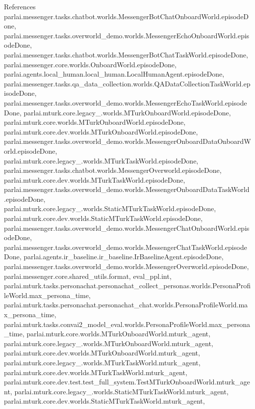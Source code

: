 References parlai.\+messenger.\+tasks.\+chatbot.\+worlds.\+Messenger\+Bot\+Chat\+Onboard\+World.\+episode\+Done, parlai.\+messenger.\+tasks.\+overworld\+\_\+demo.\+worlds.\+Messenger\+Echo\+Onboard\+World.\+episode\+Done, parlai.\+messenger.\+tasks.\+chatbot.\+worlds.\+Messenger\+Bot\+Chat\+Task\+World.\+episode\+Done, parlai.\+messenger.\+core.\+worlds.\+Onboard\+World.\+episode\+Done, parlai.\+agents.\+local\+\_\+human.\+local\+\_\+human.\+Local\+Human\+Agent.\+episode\+Done, parlai.\+messenger.\+tasks.\+qa\+\_\+data\+\_\+collection.\+worlds.\+Q\+A\+Data\+Collection\+Task\+World.\+episode\+Done, parlai.\+messenger.\+tasks.\+overworld\+\_\+demo.\+worlds.\+Messenger\+Echo\+Task\+World.\+episode\+Done, parlai.\+mturk.\+core.\+legacy\+\_.\+worlds.\+M\+Turk\+Onboard\+World.\+episode\+Done, parlai.\+mturk.\+core.\+worlds.\+M\+Turk\+Onboard\+World.\+episode\+Done, parlai.\+mturk.\+core.\+dev.\+worlds.\+M\+Turk\+Onboard\+World.\+episode\+Done, parlai.\+messenger.\+tasks.\+overworld\+\_\+demo.\+worlds.\+Messenger\+Onboard\+Data\+Onboard\+World.\+episode\+Done, parlai.\+mturk.\+core.\+legacy\+\_.\+worlds.\+M\+Turk\+Task\+World.\+episode\+Done, parlai.\+messenger.\+tasks.\+chatbot.\+worlds.\+Messenger\+Overworld.\+episode\+Done, parlai.\+mturk.\+core.\+dev.\+worlds.\+M\+Turk\+Task\+World.\+episode\+Done, parlai.\+messenger.\+tasks.\+overworld\+\_\+demo.\+worlds.\+Messenger\+Onboard\+Data\+Task\+World.\+episode\+Done, parlai.\+mturk.\+core.\+legacy\+\_.\+worlds.\+Static\+M\+Turk\+Task\+World.\+episode\+Done, parlai.\+mturk.\+core.\+dev.\+worlds.\+Static\+M\+Turk\+Task\+World.\+episode\+Done, parlai.\+messenger.\+tasks.\+overworld\+\_\+demo.\+worlds.\+Messenger\+Chat\+Onboard\+World.\+episode\+Done, parlai.\+messenger.\+tasks.\+overworld\+\_\+demo.\+worlds.\+Messenger\+Chat\+Task\+World.\+episode\+Done, parlai.\+agents.\+ir\+\_\+baseline.\+ir\+\_\+baseline.\+Ir\+Baseline\+Agent.\+episode\+Done, parlai.\+messenger.\+tasks.\+overworld\+\_\+demo.\+worlds.\+Messenger\+Overworld.\+episode\+Done, parlai.\+messenger.\+core.\+shared\+\_\+utils.\+format, eval\+\_\+ppl.\+int, parlai.\+mturk.\+tasks.\+personachat.\+personachat\+\_\+collect\+\_\+personas.\+worlds.\+Persona\+Profile\+World.\+max\+\_\+persona\+\_\+time, parlai.\+mturk.\+tasks.\+personachat.\+personachat\+\_\+chat.\+worlds.\+Persona\+Profile\+World.\+max\+\_\+persona\+\_\+time, parlai.\+mturk.\+tasks.\+convai2\+\_\+model\+\_\+eval.\+worlds.\+Persona\+Profile\+World.\+max\+\_\+persona\+\_\+time, parlai.\+mturk.\+core.\+worlds.\+M\+Turk\+Onboard\+World.\+mturk\+\_\+agent, parlai.\+mturk.\+core.\+legacy\+\_.\+worlds.\+M\+Turk\+Onboard\+World.\+mturk\+\_\+agent, parlai.\+mturk.\+core.\+dev.\+worlds.\+M\+Turk\+Onboard\+World.\+mturk\+\_\+agent, parlai.\+mturk.\+core.\+legacy\+\_.\+worlds.\+M\+Turk\+Task\+World.\+mturk\+\_\+agent, parlai.\+mturk.\+core.\+dev.\+worlds.\+M\+Turk\+Task\+World.\+mturk\+\_\+agent, parlai.\+mturk.\+core.\+dev.\+test.\+test\+\_\+full\+\_\+system.\+Test\+M\+Turk\+Onboard\+World.\+mturk\+\_\+agent, parlai.\+mturk.\+core.\+legacy\+\_.\+worlds.\+Static\+M\+Turk\+Task\+World.\+mturk\+\_\+agent, parlai.\+mturk.\+core.\+dev.\+worlds.\+Static\+M\+Turk\+Task\+World.\+mturk\+\_\+agent, 